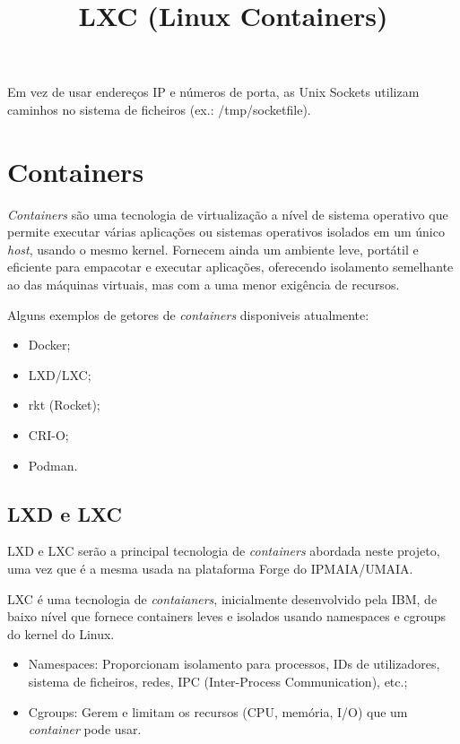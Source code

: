 Em vez de usar endereços IP e números de porta, as Unix Sockets utilizam caminhos 
no sistema de ficheiros (ex.: /tmp/socketfile).

\section{Containers}

\textit{Containers} são uma tecnologia de virtualização a nível de sistema operativo que 
permite executar várias aplicações ou sistemas operativos isolados em um único \textit{host}, usando o mesmo kernel. 
Fornecem ainda um ambiente leve, portátil e eficiente para empacotar e executar aplicações,
oferecendo isolamento semelhante ao das máquinas virtuais, mas com a uma menor
exigência de recursos.

Alguns exemplos de getores de \textit{containers} disponiveis atualmente:
\begin{itemize}
    \item Docker;
    \item LXD/LXC;
    \item rkt (Rocket);
    \item CRI-O;
    \item Podman.
\end{itemize}



\subsection{LXD e LXC}

LXD e LXC serão a principal tecnologia de \textit{containers} abordada neste projeto,
uma vez que é a mesma usada na plataforma Forge do IPMAIA/UMAIA. \\



\title*{\textbf{LXC (Linux Containers)}}

LXC é uma tecnologia de \textit{contaianers}, inicialmente desenvolvido pela IBM, 
de baixo nível que fornece containers leves e isolados usando namespaces e cgroups 
do kernel do Linux. \\

\begin{itemize}
    \item Namespaces: Proporcionam isolamento para processos, IDs de utilizadores, 
    sistema de ficheiros, redes, IPC (Inter-Process Communication), etc.;
    \item Cgroups: Gerem e limitam os recursos (CPU, memória, I/O) que um
    \textit{container} pode usar.
\end{itemize}

